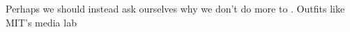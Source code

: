 \documentclass[acmtocl]{acmtrans2m}
\newcommand{\comment}[1]{}
\begin{document}
Perhaps we should instead ask ourselves why we don't do more to . Outfits like MIT's media lab









\end{document}
